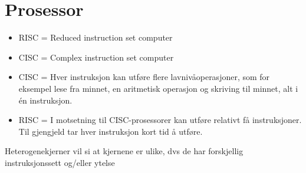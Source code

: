 \documentclass[a4paper, 10pt]{article}
\begin{document}
\section{Prosessor}

\begin{itemize}
\item RISC = Reduced instruction set computer 
\item CISC = Complex instruction set computer
\item CISC = Hver instruksjon kan utføre flere lavnivåoperasjoner, som for eksempel lese fra minnet, en aritmetisk operasjon og skriving til minnet, alt i én instruksjon.
\item RISC = I motsetning til CISC-prosessorer kan utføre relativt få instruksjoner. Til gjengjeld tar hver instruksjon kort tid å utføre.
\end{itemize}

Heterogenekjerner vil si at kjernene er ulike, dvs de har forskjellig instruksjonssett og/eller ytelse
\end{document}
